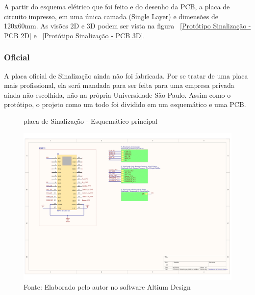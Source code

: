 \documentclass[../delivery_hospital_report.tex]{subfiles}
\begin{document}
A partir do esquema elétrico que foi feito e do desenho da PCB, a placa de circuito impresso, em uma única camada (Single Layer) e dimensões de 120x60mm. As visões 2D e 3D podem ser vista na figura ~\ref{Protótipo Sinalização - PCB 2D} e ~\ref{Protótipo Sinalização - PCB 3D}.

\clearpage
\subsubsection{Oficial}

A placa oficial de Sinalização ainda não foi fabricada. Por se tratar de uma placa mais profissional, ela será mandada para ser feita para uma empresa privada ainda não escolhida, não na própria Universidade São Paulo. Assim como o protótipo, o projeto como um todo foi dividido em um esquemático e uma PCB.

\begin{figure}[!h]
\centering
    \caption{placa de Sinalização - Esquemático principal }
    \centering %
    \includegraphics[width=17cm]{modulos/Sinalização_Official-1.png}
    \caption*{Fonte: Elaborado pelo autor no software Altium Design\cite{altium21} }
    \label{Protótipo placa de ## - Esquemático principal}
\end{figure}
\end{document}
